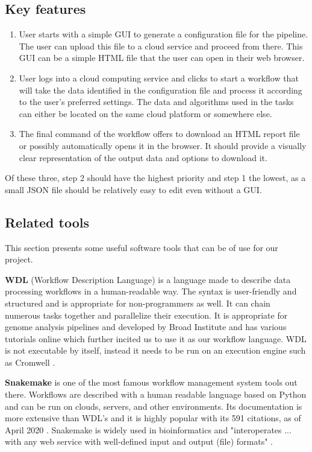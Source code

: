 \documentclass{article}
\begin{document}
\subsection{Key features}
\begin{enumerate}
    \item User starts with a simple GUI to generate a configuration file for the pipeline. The user can upload this file to a cloud service and proceed from there. This GUI can be a simple HTML file that the user can open in their web browser.
    \item User logs into a cloud computing service and clicks to start a workflow that will take the data identified in the configuration file and process it according to the user's preferred settings. The data and algorithms used in the tasks can either be located on the same cloud platform or somewhere else.
    \item The final command of the workflow offers to download an HTML report file or possibly automatically opens it in the browser. It should provide a visually clear representation of the output data and options to download it.
\end{enumerate}
Of these three, step 2 should have the highest priority and step 1 the lowest, as a small JSON file should be relatively easy to edit even without a GUI.


\subsection{Related tools}
This section presents some useful software tools that can be of use for our project. 

\textbf{WDL} (Workflow Description Language) is a language made to describe data processing workflows in a human-readable way. The syntax is user-friendly and structured and is appropriate for non-programmers as well. It can chain numerous tasks together and parallelize their execution. It is appropriate for genome analysis pipelines and developed by Broad Institute and has various tutorials online which further incited us to use it as our workflow language. WDL is not executable by itself, instead it needs to be run on an execution engine such as Cromwell \cite{wdl}.

\textbf{Snakemake} is one of the most famous workflow management system tools out there. Workflows are described with a human readable language based on Python and can be run on clouds, servers, and other environments. Its documentation is more extensive than WDL's and it is highly popular with its 591 citations, as of April 2020 \cite{dimensions}. Snakemake is widely used in bioinformatics and "interoperates ...  with any web service with well-defined input and output  (file) formats" \cite{snakemake}.
\end{document}
